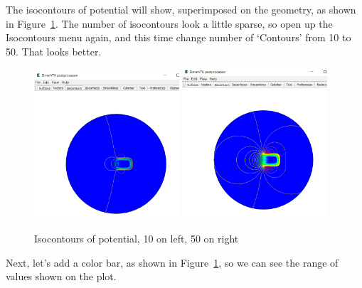 The isocontours of potential will show, superimposed on the geometry, as shown in Figure~\ref{fg:vtk-4}.  The number of isocontours look a little sparse, so open up the Isocontours menu again, and this time change number of `Contours' from 10 to 50.  That looks better.

\begin{figure}[H]
\begin{center}
\includegraphics[width=0.48\textwidth]{vtk-4}
\includegraphics[width=0.48\textwidth]{vtk-5}
\caption{Isocontours of potential, 10 on left, 50 on right}\label{fg:vtk-4}
\end{center}
\end{figure}

\newpage

Next, let's add a color bar, as shown in Figure~\ref{fg:vtk-4}, so we can see the range of values shown on the plot.

